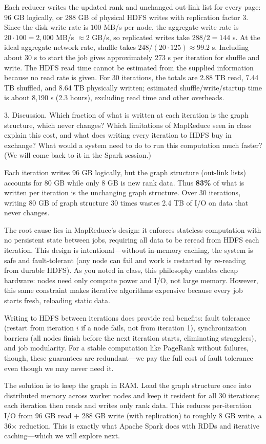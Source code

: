 \documentclass[11pt,a4paper]{article}
\begin{document}
Each reducer writes the updated rank and unchanged out-link list for every page: 96 GB logically, or 288 GB of physical HDFS writes with replication factor 3. Since the disk write rate is $100$ MB/s per node, the aggregate write rate is $20\cdot100=2{,}000$ MB/s $\approx 2$ GB/s, so replicated writes take $288/2=144$ s. At the ideal aggregate network rate, shuffle takes $248/(20\cdot125)\approx99.2$ s. Including about 30 s to start the job gives approximately 273 s per iteration for shuffle and write. The HDFS read time cannot be estimated from the supplied information because no read rate is given. For 30 iterations, the totals are 2.88 TB read, 7.44 TB shuffled, and 8.64 TB physically written; estimated shuffle/write/startup time is about 8,190 s (2.3 hours), excluding read time and other overheads.

\begin{tcolorbox}[colback=gray!20,colframe=gray!20, sharp corners]
3. Discussion. Which fraction of what is written at each iteration is the graph structure, which never changes? Which limitations of MapReduce seen in class explain this cost, and what does writing every iteration to HDFS buy in exchange? What would a system need to do to run this computation much faster? (We will come back to it in the Spark session.)
\end{tcolorbox}

Each iteration writes 96 GB logically, but the graph structure (out-link lists) accounts for $80$ GB while only 8 GB is new rank data. Thus \textbf{83\%} of what is written per iteration is the unchanging graph structure. Over 30 iterations, writing 80 GB of graph structure 30 times wastes 2.4 TB of I/O on data that never changes.

The root cause lies in MapReduce's design: it enforces stateless computation with no persistent state between jobs, requiring all data to be reread from HDFS each iteration. This design is intentional—without in-memory caching, the system is safe and fault-tolerant (any node can fail and work is restarted by re-reading from durable HDFS). As you noted in class, this philosophy enables cheap hardware: nodes need only compute power and I/O, not large memory. However, this same constraint makes iterative algorithms expensive because every job starts fresh, reloading static data.

Writing to HDFS between iterations does provide real benefits: fault tolerance (restart from iteration $i$ if a node fails, not from iteration 1), synchronization barriers (all nodes finish before the next iteration starts, eliminating stragglers), and job modularity. For a stable computation like PageRank without failures, though, these guarantees are redundant—we pay the full cost of fault tolerance even though we may never need it.

The solution is to keep the graph in RAM. Load the graph structure once into distributed memory across worker nodes and keep it resident for all 30 iterations; each iteration then reads and writes only rank data. This reduces per-iteration I/O from 96 GB read + 288 GB write (with replication) to roughly 8 GB write, a 36× reduction. This is exactly what Apache Spark does with RDDs and iterative caching—which we will explore next.
\end{document}
